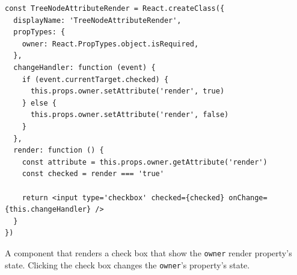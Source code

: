 \begin{listing}
  \begin{verbatim}
const TreeNodeAttributeRender = React.createClass({
  displayName: 'TreeNodeAttributeRender',
  propTypes: {
    owner: React.PropTypes.object.isRequired,
  },
  changeHandler: function (event) {
    if (event.currentTarget.checked) {
      this.props.owner.setAttribute('render', true)
    } else {
      this.props.owner.setAttribute('render', false)
    }
  },
  render: function () {
    const attribute = this.props.owner.getAttribute('render')
    const checked = render === 'true'

    return <input type='checkbox' checked={checked} onChange={this.changeHandler} />
  }
})
  \end{verbatim}
  \caption{A component that renders a check box that show the \texttt{owner} render property's state. Clicking the check box changes the \texttt{owner}'s property's state.}
  \label{list:checkbox}
\end{listing}

